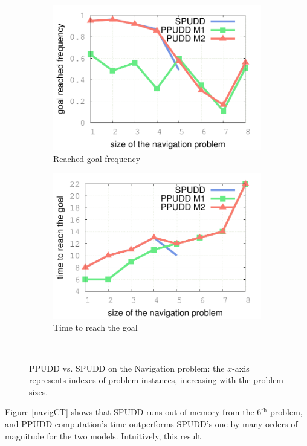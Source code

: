 \begin{figure}
\begin{subfigure}[b]{.48\linewidth}
\includegraphics[width=\linewidth]{courbePerfMDP.pdf}
\caption{Reached goal frequency}
\label{navigGOAL}
\end{subfigure}
\begin{subfigure}[b]{.48\linewidth}
\includegraphics[width=\linewidth]{courbePerfMDP2.pdf}
\caption{Time to reach the goal}
\label{navigL}
\end{subfigure}\\
\vspace{0.5cm}
\caption[PPUDD vs. SPUDD, Navigation problem]{PPUDD vs. SPUDD on the Navigation problem: the $x$-axis represents indexes of problem instances, increasing with the problem sizes.}
\end{figure}
Figure \ref{navigCT} shows that 
SPUDD runs out of memory from the 6$^{\text{th}}$ problem, and PPUDD computation's time
outperforms SPUDD's one by many orders of magnitude for the two models. Intuitively, this result
